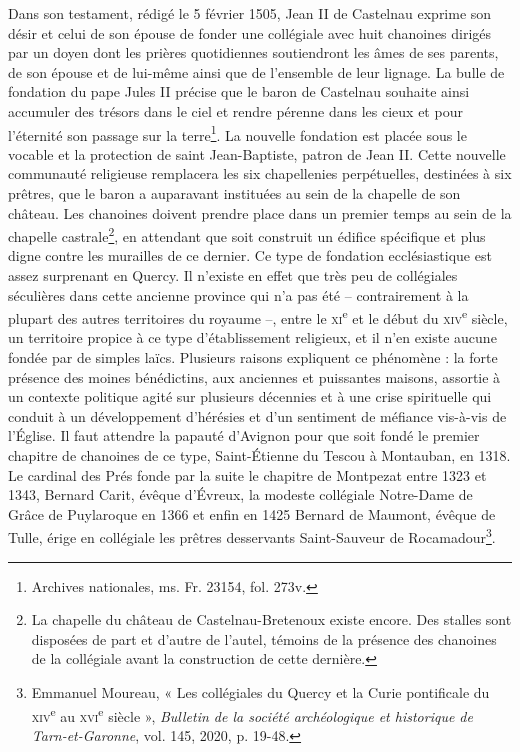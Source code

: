 \documentclass[12pt,twoside,openany]{book}
\begin{document}
Dans son testament, rédigé le 5 février 1505, Jean II de Castelnau exprime son désir et celui de son épouse de fonder une collégiale avec huit chanoines dirigés par un doyen dont les prières quotidiennes soutiendront les âmes de ses parents, de son épouse et de lui-même ainsi que de l’ensemble de leur lignage. La bulle de fondation du pape Jules II précise que le baron de Castelnau souhaite ainsi accumuler des trésors dans le ciel et rendre pérenne dans les cieux et pour l’éternité son passage sur la terre\footnote{Archives nationales, ms. Fr. 23154, fol. 273v.}. La nouvelle fondation est placée sous le vocable et la protection de saint Jean-Baptiste, patron de Jean II. Cette nouvelle communauté religieuse remplacera les six chapellenies perpétuelles, destinées à six prêtres, que le baron a auparavant instituées au sein de la chapelle de son château. Les chanoines doivent prendre place dans un premier temps au sein de la chapelle castrale\footnote{La chapelle du château de Castelnau-Bretenoux existe encore. Des stalles sont disposées de part et d’autre de l’autel, témoins de la présence des chanoines de la collégiale avant la construction de cette dernière.}, en attendant que soit construit un édifice spécifique et plus digne contre les murailles de ce dernier. Ce type de fondation ecclésiastique est assez surprenant en Quercy. Il n’existe en effet que très peu de collégiales séculières dans cette ancienne province qui n’a pas été – contrairement à la plupart des autres territoires du royaume –, entre le \textsc{xi}\textsuperscript{e} et le début du \textsc{xiv}\textsuperscript{e} siècle, un territoire propice à ce type d’établissement religieux, et il n’en existe aucune fondée par de simples laïcs. Plusieurs raisons expliquent ce phénomène : la forte présence des moines bénédictins, aux anciennes et puissantes maisons, assortie à un contexte politique agité sur plusieurs décennies et à une crise spirituelle qui conduit à un développement d’hérésies et d’un sentiment de méfiance vis-à-vis de l’Église. Il faut attendre la papauté d’Avignon pour que soit fondé le premier chapitre de chanoines de ce type, Saint-Étienne du Tescou à Montauban, en 1318. Le cardinal des Prés fonde par la suite le chapitre de Montpezat entre 1323 et 1343, Bernard Carit, évêque d’Évreux, la modeste collégiale Notre-Dame de Grâce de Puylaroque en 1366 et enfin en 1425 Bernard de Maumont, évêque de Tulle, érige en collégiale les prêtres desservants Saint-Sauveur de Rocamadour\footnote{Emmanuel Moureau, « Les collégiales du Quercy et la Curie pontificale du \textsc{xiv}\textsuperscript{e} au \textsc{xvi}\textsuperscript{e} siècle », \textit{Bulletin de la société archéologique et historique de Tarn-et-Garonne}, vol. 145, 2020, p. 19-48.}.
\end{document}
